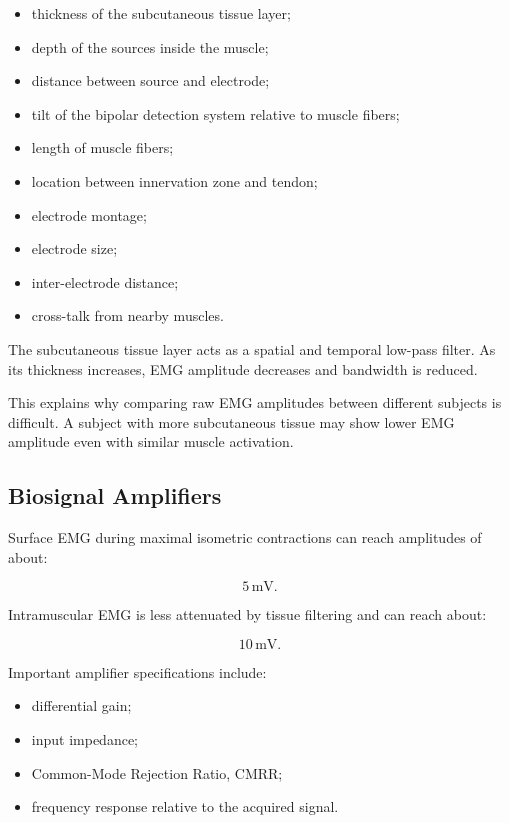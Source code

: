 \begin{itemize}[noitemsep]
    \item thickness of the subcutaneous tissue layer;
    \item depth of the sources inside the muscle;
    \item distance between source and electrode;
    \item tilt of the bipolar detection system relative to muscle fibers;
    \item length of muscle fibers;
    \item location between innervation zone and tendon;
    \item electrode montage;
    \item electrode size;
    \item inter-electrode distance;
    \item cross-talk from nearby muscles.
\end{itemize}

The subcutaneous tissue layer acts as a spatial and temporal low-pass filter. As its thickness increases, EMG amplitude decreases and bandwidth is reduced.

\begin{authornote}
This explains why comparing raw EMG amplitudes between different subjects is difficult. A subject with more subcutaneous tissue may show lower EMG amplitude even with similar muscle activation.
\end{authornote}

\subsection{Biosignal Amplifiers}

Surface EMG during maximal isometric contractions can reach amplitudes of about:

\[
5\,\text{mV}.
\]

Intramuscular EMG is less attenuated by tissue filtering and can reach about:

\[
10\,\text{mV}.
\]

Important amplifier specifications include:

\begin{itemize}[noitemsep]
    \item differential gain;
    \item input impedance;
    \item Common-Mode Rejection Ratio, CMRR;
    \item frequency response relative to the acquired signal.
\end{itemize}

